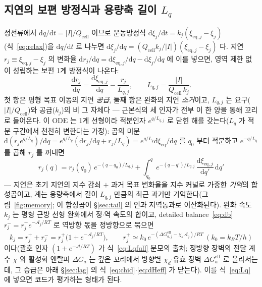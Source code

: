 \documentclass[11pt,a4paper]{article}
\newcommand{\dd}{\mathrm{d}}
\newcommand{\eff}{\mathrm{eff}}
\newcommand{\eq}{\mathrm{eq}}
\newcommand{\cell}{\mathrm{cell}}
\begin{document}
\subsection{지연의 보편 방정식과 용량축 길이 $L_q$}
정전류에서 $\dd q/\dd t=|I|/Q_\cell$ 이므로 운동방정식 $\dd\xi_j/\dd t=k_j(\xi_{\eq,j}-\xi_j)$(식~\eqref{eq:relax})을
$\dd q/\dd t$ 로 나누면 $\dd\xi_j/\dd q=(Q_\cell k_j/|I|)(\xi_{\eq,j}-\xi_j)$ 다. 지연 $r_j\equiv\xi_{\eq,j}-\xi_j$ 의
변화율 $\dd r_j/\dd q=\dd\xi_{\eq,j}/\dd q-\dd\xi_j/\dd q$ 에 이를 넣으면, 영역 제한 없이 성립하는 보편 1계 방정식이
나온다:
\begin{equation}
\frac{\dd r_j}{\dd q}=\frac{\dd\xi_{\eq,j}}{\dd q}-\frac{r_j}{L_{q,j}},
\qquad L_{q,j}=\frac{|I|}{Q_\cell\,k_j}.
\label{eq:Lq}
\end{equation}
첫 항은 평형 목표 이동의 지연 \emph{공급}, 둘째 항은 완화의 지연 \emph{소거}이고, $L_{q,j}$ 는 요구($|I|/Q_\cell$)와
공급($k_j$)의 비 그 자체다 --- 근본식의 세 인자가 전부 이 한 양을 통해 꼬리로 들어온다. 이 ODE 는 1계 선형이라
적분인자 $e^{q/L_{q,j}}$ 로 닫힌 해를 갖는다($L_q$ 가 적분 구간에서 천천히 변한다는 가정): 곱의 미분
$\dd(r_je^{q/L_q})/\dd q=e^{q/L_q}(\dd r_j/\dd q+r_j/L_q)=e^{q/L_q}\dd\xi_\eq/\dd q$ 를 $q_0$ 부터 적분하고
$e^{-q/L_q}$ 를 곱해 $r_j$ 를 꺼내면
\begin{equation}
r_j(q)=r_j(q_0)\,e^{-(q-q_0)/L_{q,j}}
+\int_{q_0}^{q}e^{-(q-q')/L_{q,j}}\,\frac{\dd\xi_{\eq,j}}{\dd q'}\,\dd q'
\label{eq:memory}
\end{equation}
--- 지연은 초기 지연의 지수 감쇠 $+$ 과거 목표 변화율을 지수 커널로 가중한 \emph{기억}의 합성곱이고, 계는 용량축에서
길이 $L_{q,j}$ 만큼의 최근 과거만 기억한다(그림~\ref{fig:memory}; 이 합성곱이 \S\ref{sec:tail} 의 인과 저역통과로
이산화된다). 완화 속도 $k_j$ 는 평형 근방 선형 완화에서 정$\cdot$역 속도의 합이고, detailed balance~\eqref{eq:db}
$r_j^-=r_j^+e^{-\mathcal A_j/RT}$ 로 역방향 몫을 정방향으로 묶으면
\begin{equation}
k_j=r_j^++r_j^-=r_j^+\big(1+e^{-\mathcal A_j/RT}\big),\qquad
r_j^+\simeq k_0\,e^{-(\Delta G_{a,j}^\eff-\chi_d\mathcal A_j)/RT}\ (k_0=k_BT/h)
\label{eq:kuniv}
\end{equation}
이다(괄호 인자 $(1+e^{-\mathcal A/RT})$ 가 식~\eqref{eq:Lqfull} 분모의 출처; 정방향 장벽의 전달 계수 $\chi$ 와 활성화
엔탈피 $\Delta G_a$ 는 깊은 꼬리에서 방향별 $\chi_d$$\cdot$유효 장벽 $\Delta G_a^\eff$ 로 올라서는데, 그 승급은 아래
\S\ref{sec:lag} 의 식~\eqref{eq:chid}$\cdot$\eqref{eq:dHeff} 가 닫는다). 이를 식~\eqref{eq:Lq} 에 넣으면 코드가
평가하는 형태가 된다.
\end{document}
